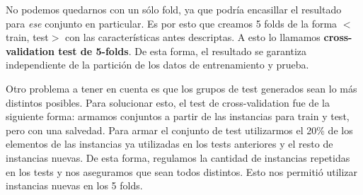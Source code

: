 No podemos quedarnos con un sólo fold, ya que podría encasillar el resultado para \textit{ese} conjunto en particular. Es por esto que creamos 5 folds de la forma $<$train, test$>$ con las características antes descriptas. A esto lo llamamos \textbf{cross-validation test de 5-folds}. De esta forma, el resultado se garantiza independiente de la partición de los datos de entrenamiento y prueba.

Otro problema a tener en cuenta es que los grupos de test generados sean lo más distintos posibles. Para solucionar esto, el test de cross-validation fue de la siguiente forma: armamos conjuntos a partir de las instancias para train y test, pero con una salvedad. Para armar el conjunto de test utilizarmos el 20\% de los elementos de las instancias ya utilizadas en los tests anteriores y el resto de instancias nuevas. De esta forma, regulamos la cantidad de instancias repetidas en los tests y nos aseguramos que sean todos distintos. Esto nos permitió utilizar instancias nuevas en los 5 folds. 

